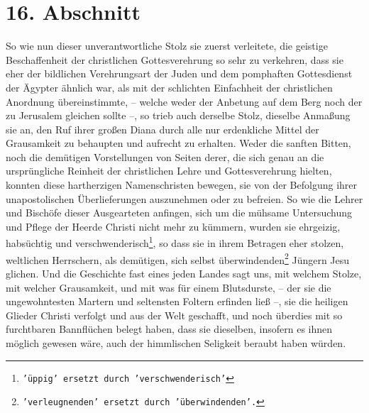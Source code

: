 \section{16. Abschnitt} \label{kap7_ab16}

So wie nun dieser unverantwortliche Stolz sie zuerst verleitete, die geistige
Beschaffenheit der christlichen Gottesverehrung so sehr
zu verkehren, dass sie
eher der bildlichen Verehrungsart der Juden und dem
pomphaften Gottesdienst
der Ägypter ähnlich war, als mit der schlichten
Einfachheit der christlichen
Anordnung übereinstimmte, -- welche weder der Anbetung auf dem Berg noch der zu
Jerusalem gleichen sollte --, so trieb auch derselbe
Stolz, dieselbe
Anmaßung sie an, den Ruf ihrer großen Diana durch alle
nur erdenkliche
Mittel der Grausamkeit zu behaupten und aufrecht zu erhalten. Weder die sanften
Bitten, noch die demütigen Vorstellungen von Seiten derer, die sich genau an
die ursprüngliche Reinheit der christlichen Lehre und
Gottesverehrung hielten,
konnten diese hartherzigen Namenschristen
bewegen, sie von der Befolgung ihrer
unapostolischen Überlieferungen
auszunehmen oder zu befreien. So wie die Lehrer
und Bischöfe dieser Ausgearteten anfingen, sich um die
mühsame Untersuchung und
Pflege der Heerde Christi nicht mehr zu kümmern, wurden sie ehrgeizig,
habsüchtig und verschwenderisch\footnote{\texttt{'üppig' ersetzt durch
'verschwenderisch'}}, so dass sie in ihrem Betragen eher stolzen, weltlichen
Herrschern, als demütigen, sich selbst
überwindenden\footnote{\texttt{'verleugnenden' ersetzt durch 'überwindenden'.}}
Jüngern Jesu glichen.
Und die Geschichte fast eines jeden Landes sagt uns, mit welchem Stolze, mit
welcher Grausamkeit, und mit was für einem Blutsdurste, --
der sie die
ungewohntesten Martern und seltensten Foltern erfinden
ließ --, sie die
heiligen Glieder Christi
verfolgt und aus der Welt geschafft, und noch
überdies mit so furchtbaren Bannflüchen belegt haben, dass
sie
dieselben,
insofern es ihnen möglich gewesen wäre, auch der himmlischen
Seligkeit beraubt
haben würden.

\medskip

